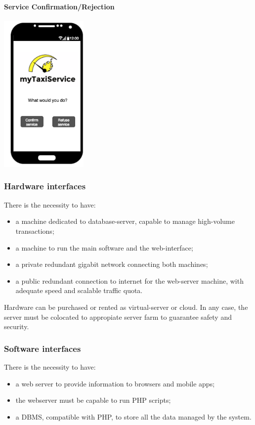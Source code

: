 		\paragraph{Service Confirmation/Rejection}
		\begin{center}
		    \includegraphics[width=0.32\textwidth]{./images/TELEFONO7}
		\end{center}
		
		\subsubsection{Hardware interfaces}
			There is the necessity to have:
			\begin{itemize}
				\item a machine dedicated to database-server, capable to manage high-volume transactions;
				\item a machine to run the main software and the web-interface;
				\item a private redundant gigabit network connecting both machines;
				\item a public redundant connection to internet for the web-server machine, with adequate speed and scalable traffic quota.
			\end{itemize}
			Hardware can be purchased or rented as virtual-server or cloud. In any case, the server must be colocated to appropiate server farm to guarantee safety and security.
		\subsubsection{Software interfaces}
			There is the necessity to have:
			\begin{itemize}
				\item a web server to provide information to browsers and mobile apps;
				\item the webserver must be capable to run PHP scripts;
				\item a DBMS, compatible with PHP, to store all the data managed by the system.
			\end{itemize}
